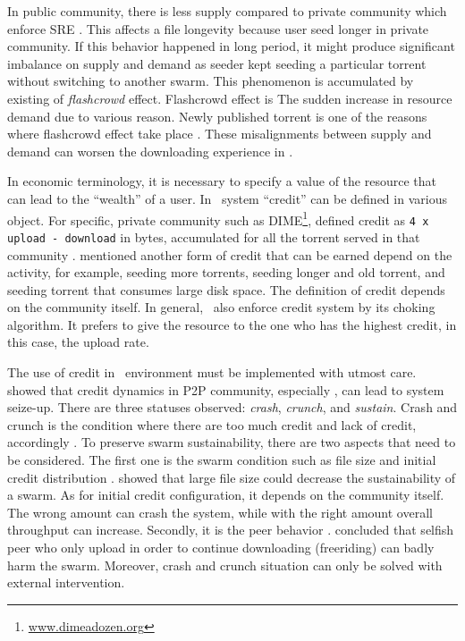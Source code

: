 In public community, there is less supply compared to private community which enforce SRE \cite{2009:demandsupplyres:andrade}. This affects a file longevity because user seed longer in private community. If this behavior happened in long period, it might produce significant imbalance on supply and demand as seeder kept seeding a particular torrent without switching to another swarm. This phenomenon is accumulated by existing of \textit{flashcrowd} effect. Flashcrowd effect is The sudden increase in resource demand due to various reason. Newly published torrent is one of the reasons where flashcrowd effect take place \cite{2013:swarmevolution:su}. These misalignments between supply and demand can worsen the downloading experience in \bt.

In economic terminology, it is necessary to specify a value of the resource that can lead to the ``wealth'' of a user. In \bt~system ``credit'' can be defined in various object. For specific, private community such as DIME\footnote{\url{www.dimeadozen.org}}, \citeauthor{2012:economicbt:kash}  defined credit as \texttt{4 x upload - download} in bytes, accumulated for all the torrent served in that community \cite{2012:economicbt:kash}. \citeauthor{2014:sustainabilitytorrent:chen} mentioned another form of credit that can be earned depend on the activity, for example, seeding more torrents, seeding longer and old torrent, and seeding torrent that consumes large disk space\cite{2014:sustainabilitytorrent:chen}. The definition of credit depends on the community itself. In general, \bt~also enforce credit system by its choking algorithm. It prefers to give the resource to the one who has the highest credit, in this case, the upload rate.

The use of credit in \bt~environment must be implemented with utmost care. \citeauthor{2010:crashsustain:rahman} showed that credit dynamics in P2P community, especially \bt, can lead to system seize-up. There are three statuses observed: \textit{crash}, \textit{crunch}, and \textit{sustain}. Crash and crunch is the condition where there are too much credit and lack of credit, accordingly \cite{2015:sustainabilitypt:vinko}. To preserve swarm sustainability, there are two aspects that need to be considered. The first one is the swarm condition such as file size and initial credit distribution \cite{2015:sustainabilitypt:vinko}. \citeauthor{2015:sustainabilitypt:vinko} showed that large file size could decrease the sustainability of a swarm. As for initial credit configuration, it depends on the community itself. The wrong amount can crash the system, while with the right amount overall throughput can increase. Secondly, it is the peer behavior \cite{2010:crashsustain:rahman}. \citeauthor{2010:crashsustain:rahman} concluded that selfish peer who only upload in order to continue downloading (freeriding) can badly harm the swarm. Moreover, crash and crunch situation can only be solved with external intervention.

